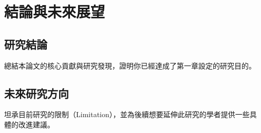 \chapter{結論與未來展望}
\label{cha:CH6-Conclusion} 

\section{研究結論}
總結本論文的核心貢獻與研究發現，證明你已經達成了第一章設定的研究目的。

\section{未來研究方向}
坦承目前研究的限制（Limitation），並為後續想要延伸此研究的學者提供一些具體的改進建議。

